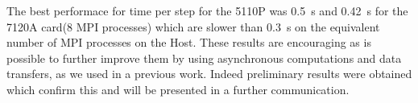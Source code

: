 \par{The best performace for time per step for the 5110P was 0.5~s and 0.42~s for the 7120A card(8 MPI processes) which are slower 
than 0.3~s on the equivalent number of MPI processes on the Host. These results are encouraging as is possible to further improve 
them by using asynchronous computations and data transfers, as we used in a previous work\cite{Elena2014}. Indeed preliminary results were obtained which confirm this and will
be presented in a further communication.} 


